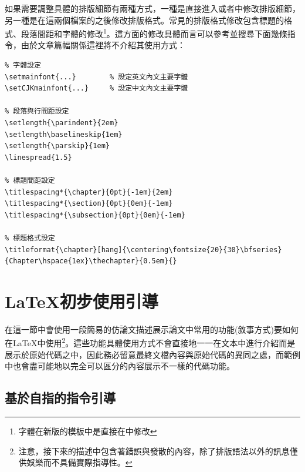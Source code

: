 \documentclass[12pt]{report}
\theoremstyle{plain}
\begin{document}
如果需要調整具體的排版細節有兩種方式，一種是直接進入或者中修改排版細節，另一種是在這兩個檔案的之後修改排版格式。常見的排版格式修改包含標題的格式、段落間距和字體的修改\footnote{字體在新版的模板中是直接在中修改}。這方面的修改具體而言可以參考並搜尋下面幾條指令，由於文章篇幅關係這裡將不介紹其使用方式：
\begin{lstlisting}
% 字體設定
\setmainfont{...}        % 設定英文內文主要字體
\setCJKmainfont{...}     % 設定中文內文主要字體

% 段落與行間距設定
\setlength{\parindent}{2em}
\setlength\baselineskip{1em}
\setlength{\parskip}{1em}
\linespread{1.5} 

% 標題間距設定
\titlespacing*{\chapter}{0pt}{-1em}{2em}
\titlespacing*{\section}{0pt}{0em}{-1em}
\titlespacing*{\subsection}{0pt}{0em}{-1em}

% 標題格式設定
\titleformat{\chapter}[hang]{\centering\fontsize{20}{30}\bfseries}{Chapter\hspace{1ex}\thechapter}{0.5em}{}
\end{lstlisting}

\section{\LaTeX 初步使用引導}

在這一節中會使用一段簡易的仿論文描述展示論文中常用的功能(敘事方式)要如何在\LaTeX{}中使用\footnote{注意，接下來的描述中包含著錯誤與發散的內容，除了排版語法以外的訊息僅供娛樂而不具備實際指導性。}。這些功能具體使用方式不會直接地一一在文本中進行介紹而是展示於原始代碼之中，因此務必留意最終文檔內容與原始代碼的異同之處，而範例中也會盡可能地以完全可以區分的內容展示不一樣的代碼功能。

\subsection{基於自指的指令引導}
\label{sec:label}
\end{document}
